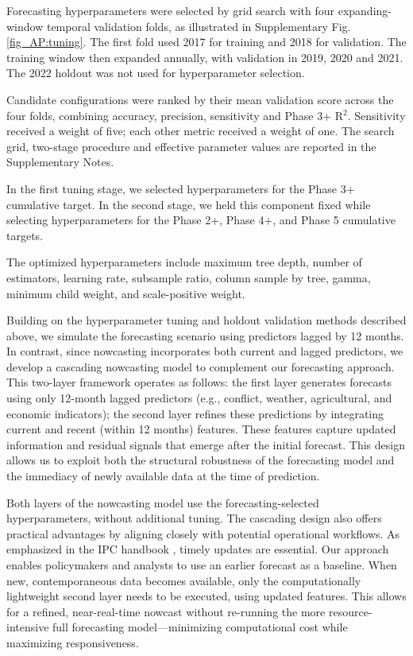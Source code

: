 \documentclass[pdflatex,sn-mathphys-num]{sn-jnl}%
\theoremstyle{thmstyleone}%
\theoremstyle{thmstyletwo}%
\theoremstyle{thmstylethree}%
\begin{document}
Forecasting hyperparameters were selected by grid search with four expanding-window temporal validation folds, as illustrated in Supplementary Fig. \ref{fig_AP:tuning}. The first fold used 2017 for training and 2018 for validation. The training window then expanded annually, with validation in 2019, 2020 and 2021. The 2022 holdout was not used for hyperparameter selection.

Candidate configurations were ranked by their mean validation score across the four folds, combining accuracy, precision, sensitivity and Phase 3+ R$^{2}$. Sensitivity received a weight of five; each other metric received a weight of one. The search grid, two-stage procedure and effective parameter values are reported in the Supplementary Notes.

In the first tuning stage, we selected hyperparameters for the Phase 3+ cumulative target. In the second stage, we held this component fixed while selecting hyperparameters for the Phase 2+, Phase 4+, and Phase 5 cumulative targets.

The optimized hyperparameters include maximum tree depth, number of estimators, learning rate, subsample ratio, column sample by tree, gamma, minimum child weight, and scale-positive weight.

Building on the hyperparameter tuning and holdout validation methods described above, we simulate the forecasting scenario using predictors lagged by 12 months. In contrast, since nowcasting incorporates both current and lagged predictors, we develop a cascading nowcasting model to complement our forecasting approach. This two-layer framework operates as follows: the first layer generates forecasts using only 12-month lagged predictors (e.g., conflict, weather, agricultural, and economic indicators); the second layer refines these predictions by integrating current and recent (within 12 months)  features. These features capture updated information and residual signals that emerge after the initial forecast. This design allows us to exploit both the structural robustness of the forecasting model and the immediacy of newly available data at the time of prediction.

Both layers of the nowcasting model use the forecasting-selected hyperparameters, without additional tuning. The cascading design also offers practical advantages by aligning closely with potential operational workflows. As emphasized in the IPC handbook \cite{IPC_nd}, timely updates are essential. Our approach enables policymakers and analysts to use an earlier forecast %
as a baseline. When new, contemporaneous data becomes available, only the computationally lightweight second layer needs to be executed, using updated features. This allows for a refined, near-real-time nowcast without re-running the more resource-intensive full forecasting model—minimizing computational cost while maximizing responsiveness.
\end{document}
